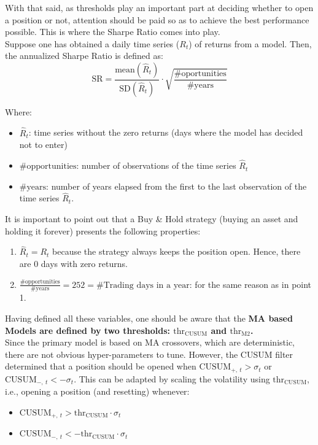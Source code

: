 \documentclass[a4paper]{report}
\begin{document}
With that said, as thresholds play an important part at deciding whether to 
open a position or not, attention should be paid so as to achieve the best 
performance possible. This is where the Sharpe Ratio comes into play.\\


Suppose one has obtained a daily time series ($R_t$) of returns from a model. 
Then, the annualized Sharpe Ratio is defined as:
\begin{equation}
	\text{SR} = \frac{\text{mean}(\widehat{R}_t)}{\text{SD}(\widehat{R}_t)} 
	\cdot \sqrt{\frac{\# \text{oportunities}}{\# \text{years}}}
\end{equation} 

Where:
\begin{itemize}
	\item $\widehat{R}_t$: time series without the zero returns (days where 
	the model has decided not to enter)
	
	\item $\#\text{opportunities}$: number of observations of the time 
	series $\widehat{R}_t$
	
	\item $\# \text{years}$: number of years elapsed from the first to the 
	last observation of the time series $\widehat{R}_t$.\\
\end{itemize}

It is important to point out that a Buy \& Hold strategy (buying an asset and 
holding it forever) presents the following properties: 
\begin{enumerate}
	\item $\widehat{R}_t = R_t$ because the strategy always keeps the 
	position open. Hence, there are 0 days with zero returns.
	
	\item $\frac{\# \text{opportunities}}{\# \text{years}} = 252 = 		
	\#\text{Trading days in a year}$: for the same reason as in point 1.	
\end{enumerate}

\vspace*{.2cm}

Having defined all these variables, one should be aware that the \textbf{MA 
based Models are defined by two thresholds: $\text{thr}_{\text{CUSUM}}$ and 
$\text{thr}_{\text{M2}}$.}\\

Since the primary model is based on MA crossovers, which are deterministic, 
there are not obvious hyper-parameters to tune. However, the CUSUM filter 
determined that a position should be opened when $\text{CUSUM}_{+,\ t} > 
\sigma_t$ or $\text{CUSUM}_{-,\ t} < -\sigma_t$. This can be adapted by 
scaling the volatility using $\text{thr}_{\text{CUSUM}}$, i.e., opening a 
position (and resetting) whenever:
\begin{itemize}
	\item $\text{CUSUM}_{+,\ t} > \text{thr}_{\text{CUSUM}} \cdot \sigma_t$
	
	\item $\text{CUSUM}_{-,\ t} < -\text{thr}_{\text{CUSUM}} \cdot \sigma_t$
\end{itemize}
\end{document}
